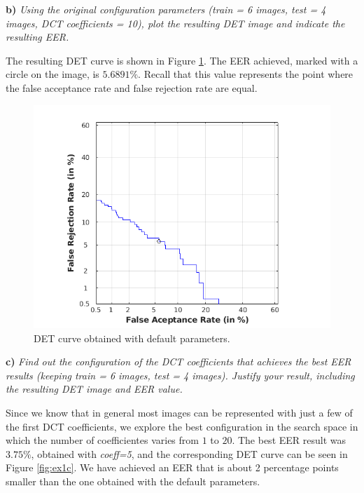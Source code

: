 \documentclass[11pt]{article}
\begin{document}
\textbf{b)} \emph{Using the original configuration parameters (train = 6 images, test = 4 images, DCT coefficients = 10), plot the resulting DET image and indicate the resulting EER.}

The resulting DET curve is shown in Figure \ref{fig:ex1b}. The EER achieved, marked with a circle on the image, is $5.6891\%$. Recall that this value represents the point where the false acceptance rate and false rejection rate are equal.

\begin{figure}[h!]
  \centering
    \includegraphics[scale=0.65]{img/1b_det}
    \caption{DET curve obtained with default parameters.}
    \label{fig:ex1b}
\end{figure}

\textbf{c)} \emph{Find out the configuration of the DCT coefficients that achieves the best EER results (keeping train = 6 images, test = 4 images). Justify your result, including the resulting DET image and EER value.}

Since we know that in general most images can be represented with just a few of the first DCT coefficients, we explore the best configuration in the search space in which the number of coefficientes varies from $1$ to $20$. The best EER result was $3.75\%$, obtained with \textit{coeff=5}, and the corresponding DET curve can be seen in Figure \ref{fig:ex1c}. We have achieved an EER that is about 2 percentage points smaller than the one obtained with the default parameters.
\end{document}
